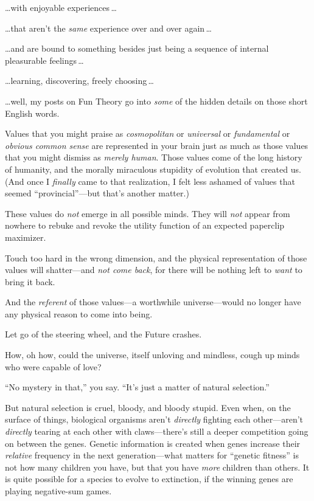  \ldots with enjoyable experiences\,\ldots


 \ldots that aren't the \textit{same} experience
over and over again\,\ldots


 \ldots and are bound to something besides just being a sequence of
internal pleasurable feelings\,\ldots


 \ldots learning, discovering, freely choosing\,\ldots


 \ldots well, my posts on Fun Theory go into \textit{some} of the
hidden details on those short English words.


 Values that you might praise as \textit{cosmopolitan} or
\textit{universal} or \textit{fundamental} or \textit{obvious common
sense} are represented in your brain just as much as those values that
you might dismiss as \textit{merely human}. Those values come of the
long history of humanity, and the morally miraculous stupidity of
evolution that created us. (And once I \textit{finally} came to that
realization, I felt less ashamed of values that seemed
``provincial''---but
that's another matter.)


 These values do \textit{not} emerge in all possible minds. They
will \textit{not} appear from nowhere to rebuke and revoke the utility
function of an expected paperclip maximizer.


 Touch too hard in the wrong dimension, and the physical
representation of those values will shatter---and \textit{not come
back}, for there will be nothing left to \textit{want} to bring it
back.


 And the \textit{referent} of those values---a worthwhile
universe---would no longer have any physical reason to come into
being.


 Let go of the steering wheel, and the Future crashes.

\myendsectiontext



 How, oh how, could the universe, itself unloving and mindless,
cough up minds who were capable of love? 


 ``No mystery in that,'' you
say. ``It's just a matter of natural
selection.''


 But natural selection is cruel, bloody, and bloody stupid. Even
when, on the surface of things, biological organisms
aren't \textit{directly} fighting each
other---aren't \textit{directly} tearing at each other
with claws---there's still a deeper competition going
on between the genes. Genetic information is created when genes
increase their \textit{relative} frequency in the next
generation---what matters for ``genetic
fitness'' is not how many children you have, but that
you have \textit{more} children than others. It is quite possible for a
species to evolve to extinction, if the winning genes are playing
negative-sum games.


